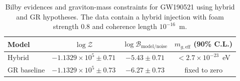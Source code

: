 \documentclass[prd,onecolumn,longbibliography,nofootinbib]{revtex4-2}
\begin{document}
\begin{table}[t]
    \centering
    \begin{ruledtabular}
    \begin{tabular}{lccc}
        Model & $\log \mathcal{Z}$ & $\log \mathcal{B}_{\mathrm{model/noise}}$ & $m_{g,\mathrm{eff}}$ (90\% C.L.) \\
        \hline
        Hybrid & $-1.1329\times10^{5} \pm 0.71$ & $-5.43 \pm 0.71$ & $<2.7\times10^{-23}$~eV \\
        GR baseline & $-1.1329\times10^{5} \pm 0.73$ & $-6.27 \pm 0.73$ & fixed to zero \\
    \end{tabular}
    \end{ruledtabular}
    \caption{Bilby evidences and graviton-mass constraints for GW190521 using hybrid and GR hypotheses. The data contain a hybrid injection with foam strength 0.8 and coherence length $10^{-16}$~m.}
    \label{tab:logz}
\end{table}
\end{document}
